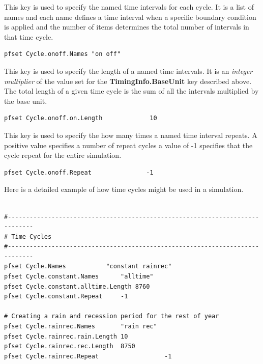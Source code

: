 {
This key is used to specify the named time intervals for each cycle.  It is a list of names and each name defines a time interval when a specific boundary condition is applied and the number of items determines the total number of intervals in that time cycle.
}
\begin{display}\begin{verbatim}
pfset Cycle.onoff.Names "on off"
\end{verbatim}\end{display}

{
This key is used to specify the length of a named time intervals.  It is an {\em integer multiplier} of the value set for the {\bf TimingInfo.BaseUnit} key described above. The total length of a given time cycle is the sum of all the intervals multiplied by the base unit.
}
\begin{display}\begin{verbatim}
pfset Cycle.onoff.on.Length             10
\end{verbatim}\end{display}

{
This key is used to specify the how many times a named time interval repeats.  A positive value specifies a number of repeat cycles a value of -1 specifies that the cycle repeat for the entire simulation.
}
\begin{display}\begin{verbatim}
pfset Cycle.onoff.Repeat               -1
\end{verbatim}\end{display}

Here is a detailed example of how time cycles might be used in a simulation.
\begin{display}\begin{verbatim}

#-----------------------------------------------------------------------------
# Time Cycles
#-----------------------------------------------------------------------------
pfset Cycle.Names 			"constant rainrec"
pfset Cycle.constant.Names		"alltime"
pfset Cycle.constant.alltime.Length	8760
pfset Cycle.constant.Repeat		-1

# Creating a rain and recession period for the rest of year
pfset Cycle.rainrec.Names		"rain rec"
pfset Cycle.rainrec.rain.Length	10
pfset Cycle.rainrec.rec.Length	8750
pfset Cycle.rainrec.Repeat              	-1
\end{verbatim}\end{display}


